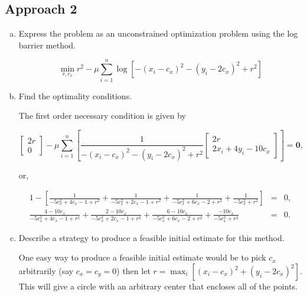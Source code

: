 \documentclass{article}
\begin{document}
\subsection{Approach 2}

\begin{enumerate}[a)]
	\item Express the problem as an unconstrained optimization problem using the log barrier method.
	
	\begin{equation*}
	\min_{r,c_x} r^2 - \mu \sum_{i=1}^n \log\left[-(x_i - c_x)^2 - (y_i - 2c_x)^2 
	+ r^2\right]
	\end{equation*}
	
	\item Find the optimality conditions.
	
	The first order necessary condition is given by
	
	\begin{equation*}
	\begin{bmatrix}2r \\ 0\end{bmatrix} - \mu \sum_{i=1}^n \left[\frac{1}{-(x_i - c_x)^2 - (y_i - 2c_x)^2 + r^2} \begin{bmatrix}2r \\ 2x_i + 4y_i - 10c_x\end{bmatrix}\right] = \mathbf{0},
	\end{equation*}
	
	or,
	
	\begin{eqnarray*}
	1 - \left[\frac{1}{-5c_x^2 + 4c_x - 1 + r^2} + \frac{1}{-5c_x^2 + 2c_x - 1 +r^2} + \frac{1}{-5c_x^2 + 6c_x - 2 +r^2} + \frac{1}{-5c_x^2 +r^2}\right] &=& 0,\\
	\frac{4-10c_x}{-5c_x^2 + 4c_x - 1 + r^2} + \frac{2-10c_x}{-5c_x^2 + 2c_x - 1 +r^2} + \frac{6-10c_x}{-5c_x^2 + 6c_x - 2 +r^2} + \frac{-10c_x}{-5c_x^2 +r^2} &=& 0.
	\end{eqnarray*}
	
	\item Describe a strategy to produce a feasible initial estimate for this method.
	
	One easy way to produce a feasible initial estimate would be to pick $c_x$ arbitrarily (say $c_x = c_y = 0$) then let $r = \max_i\left[(x_i-c_x)^2 + (y_i-2c_x)^2\right]$.
	This will give a circle with an arbitrary center that encloses all of the points.
	
\end{enumerate}
\end{document}
